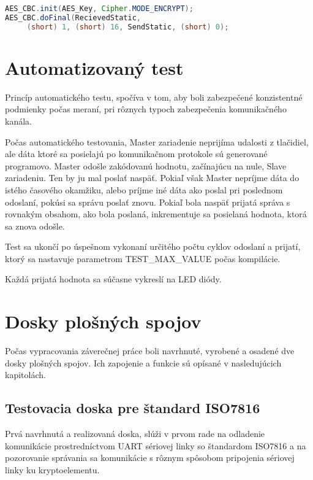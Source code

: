 \documentclass[12pt,a4wide,oneside,openright]{report}
\begin{document}
	\begin{lstlisting}[caption={Zavolanie HW kryptovania.}, label={lst:hwuse}, language=java] 
AES_CBC.init(AES_Key, Cipher.MODE_ENCRYPT);
AES_CBC.doFinal(RecievedStatic,
	 (short) 1, (short) 16, SendStatic, (short) 0);
	\end{lstlisting}
	

\section{Automatizovaný test}
Princíp automatického testu, spočíva v tom, aby boli zabezpečené konzistentné podmienky počas meraní, pri rôznych typoch zabezpečenia komunikačného kanála.

Počas automatického testovania, Master zariadenie neprijíma udalosti z tlačidiel, ale dáta ktoré sa posielajú po komunikačnom protokole sú generované programovo. Master odošle zakódovanú hodnotu, začínajúcu na nule, Slave zariadeniu. Ten by ju mal poslať naspäť. Pokiaľ však Master nepríjme dáta do istého časového okamžiku, alebo príjme iné dáta ako poslal pri poslednom odoslaní, pokúsi sa správu poslať znovu. Pokiaľ bola naspäť prijatá správa s rovnakým obsahom, ako bola poslaná, inkrementuje sa posielaná hodnota, ktorá sa znova odošle.

Test sa ukončí po úspešnom vykonaní určitého počtu cyklov odoslaní a prijatí, ktorý sa nastavuje parametrom TEST\_MAX\_VALUE počas kompilácie.

Každá prijatá hodnota sa súčasne vykreslí na LED diódy.


\newpage

\section{Dosky plošných spojov}
Počas vypracovania záverečnej práce boli navrhnuté, vyrobené a osadené dve dosky plošných spojov. Ich zapojenie a funkcie sú opísané v nasledujúcich kapitolách.

	\subsection{Testovacia doska pre štandard ISO7816} \label{isoboard}
	
	Prvá navrhnutá a realizovaná doska, slúži v prvom rade na odladenie komunikácie prostredníctvom UART sériovej linky so štandardom ISO7816 a na pozorovanie správania sa komunikácie s rôznym spôsobom pripojenia sériovej linky ku kryptoelementu.
	
\end{document}
